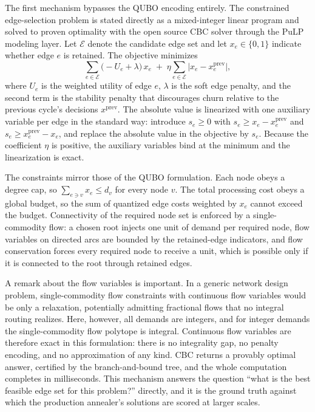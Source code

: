 The first mechanism bypasses the QUBO encoding entirely. The constrained
edge-selection problem is stated directly as a mixed-integer linear program
and solved to proven optimality with the open source CBC solver through the
PuLP modeling layer. Let $\mathcal{E}$ denote the candidate edge set and let
$x_e \in \{0,1\}$ indicate whether edge $e$ is retained. The objective
minimizes
\begin{equation}
  \sum_{e \in \mathcal{E}} \bigl(-U_e + \lambda\bigr)\, x_e
  \;+\;
  \eta \sum_{e \in \mathcal{E}} \bigl|x_e - x_e^{\mathrm{prev}}\bigr|,
\end{equation}
where $U_e$ is the weighted utility of edge $e$, $\lambda$ is the soft edge
penalty, and the second term is the stability penalty that discourages
churn relative to the previous cycle's decisions $x^{\mathrm{prev}}$. The
absolute value is linearized with one auxiliary variable per edge in the
standard way: introduce $s_e \ge 0$ with $s_e \ge x_e -
x_e^{\mathrm{prev}}$ and $s_e \ge x_e^{\mathrm{prev}} - x_e$, and replace
the absolute value in the objective by $s_e$. Because the coefficient
$\eta$ is positive, the auxiliary variables bind at the minimum and the
linearization is exact.

The constraints mirror those of the QUBO formulation. Each node obeys a
degree cap, so $\sum_{e \ni v} x_e \le d_v$ for every node $v$. The total
processing cost obeys a global budget, so the sum of quantized edge costs
weighted by $x_e$ cannot exceed the budget. Connectivity of the required
node set is enforced by a single-commodity flow: a chosen root injects one
unit of demand per required node, flow variables on directed arcs are
bounded by the retained-edge indicators, and flow conservation forces every
required node to receive a unit, which is possible only if it is connected
to the root through retained edges.

A remark about the flow variables is important. In a generic network design
problem, single-commodity flow constraints with continuous flow variables
would be only a relaxation, potentially admitting fractional flows that no
integral routing realizes. Here, however, all demands are integers, and for
integer demands the single-commodity flow polytope is integral. Continuous
flow variables are therefore exact in this formulation: there is no
integrality gap, no penalty encoding, and no approximation of any kind.
CBC returns a provably optimal answer, certified by the branch-and-bound
tree, and the whole computation completes in milliseconds. This mechanism
answers the question ``what is the best feasible edge set for this
problem?'' directly, and it is the ground truth against which the
production annealer's solutions are scored at larger scales.

